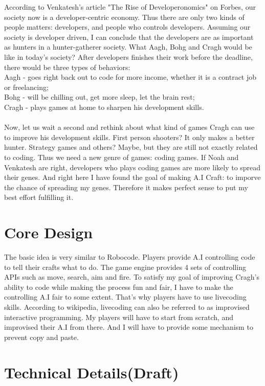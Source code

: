 \documentclass[12pt]{article}
\begin{document}
According to Venkatesh's article "The Rise of Developeronomics"\cite{venkatesh2011} on Forbes, our society now is a developer-centric economy. Thus there are only two kinds of people matters: developers, and people who controls developers. Assuming our society is developer driven, I can conclude that the developers are as important as hunters in a hunter-gatherer society. What Aagh, Bohg and Cragh would be like in today's society? After developers finishes their work before the deadline, there would be three types of behaviors:\\
Aagh - goes right back out to code for more income, whether it is a contract job or freelancing;\\
Bohg - will be chilling out, get more sleep, let the brain rest;\\
Cragh - plays games at home to sharpen his development skills.\\ 
\\
Now, let us wait a second and rethink about what kind of games Cragh can use to improve his development skills. First person shooters? It only makes a better hunter. Strategy games and others? Maybe, but they are still not exactly related to coding. Thus we need a new genre of games: coding games. If Noah and Venkatesh are right, developers who plays coding games are more likely to spread their genes. And right here I have found the goal of making A.I Craft: to imporve the chance of spreading my genes. Therefore it makes perfect sense to put my best effort fulfilling it.

\section{Core Design}
The basic idea is very similar to Robocode. Players provide A.I controlling code to tell their crafts what to do. The game engine provides 4 sets of controlling APIs such as move, search, aim and fire.
To satisfy my goal of improving Cragh's ability to code while making the process fun and fair, I have to make the controlling A.I fair to some extent.
That's why players have to use livecoding skills. According to wikipedia, livecoding can also be referred to as improvised interactive programming. My players will have to start from scratch, and improvised their A.I from there. And I will have to provide some mechanism to prevent copy and paste.

\section{Technical Details(Draft)}
\end{document}
